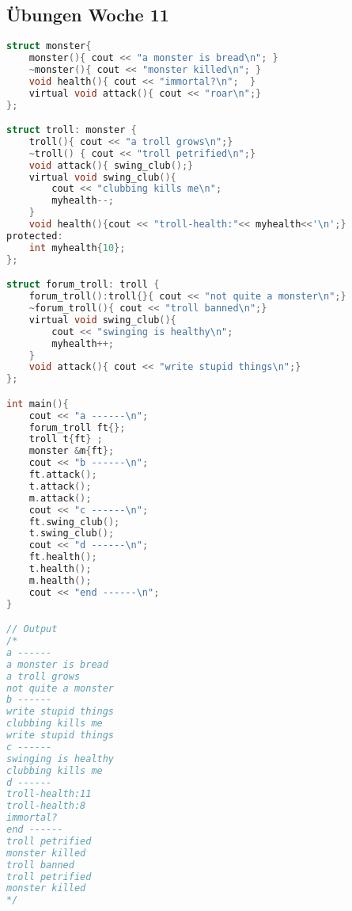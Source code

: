 
\subsection{Übungen Woche 11}

\begin{lstlisting}[style=frame, style= linenumbers, language=C]
struct monster{
	monster(){ cout << "a monster is bread\n"; }
	~monster(){ cout << "monster killed\n"; }
	void health(){ cout << "immortal?\n";  }
	virtual void attack(){ cout << "roar\n";}
};

struct troll: monster {
	troll(){ cout << "a troll grows\n";}
	~troll() { cout << "troll petrified\n";}
	void attack(){ swing_club();}
	virtual void swing_club(){
		cout << "clubbing kills me\n";
		myhealth--;
	}
	void health(){cout << "troll-health:"<< myhealth<<'\n';}
protected:
	int myhealth{10};
};

struct forum_troll: troll {
	forum_troll():troll{}{ cout << "not quite a monster\n";}
	~forum_troll(){ cout << "troll banned\n";}
	virtual void swing_club(){
		cout << "swinging is healthy\n";
		myhealth++;
	}
	void attack(){ cout << "write stupid things\n";}
};

int main(){
	cout << "a ------\n";
	forum_troll ft{};
	troll t{ft} ;
	monster &m{ft};
	cout << "b ------\n";
	ft.attack();
	t.attack();
	m.attack();
	cout << "c ------\n";
	ft.swing_club();
	t.swing_club();
	cout << "d ------\n";
	ft.health();
	t.health();
	m.health();
	cout << "end ------\n";
}

// Output
/*
a ------
a monster is bread
a troll grows
not quite a monster
b ------
write stupid things
clubbing kills me
write stupid things
c ------
swinging is healthy
clubbing kills me
d ------
troll-health:11
troll-health:8
immortal?
end ------
troll petrified
monster killed
troll banned
troll petrified
monster killed
*/

\end{lstlisting}